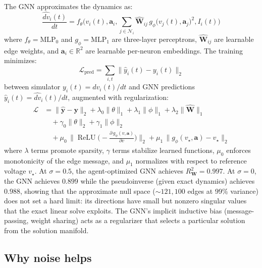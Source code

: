 \documentclass[11pt,a4paper]{article}
\begin{document}
The GNN approximates the dynamics as:
\begin{equation}
\frac{\widehat{dv}_i(t)}{dt}
=f_\theta\Big(
v_i(t),\mathbf{a}_i,
\sum_{j\in\mathcal{N}_i} \widehat{\mathbf{W}}_{ij}\,g_\phi\!\big(v_j(t),\mathbf{a}_j\big)^2,
I_i(t)\Big)
\end{equation}
where $f_\theta = \text{MLP}_0$ and $g_\phi = \text{MLP}_1$ are three-layer perceptrons, $\widehat{\mathbf{W}}_{ij}$ are learnable edge weights, and $\mathbf{a}_i \in \mathbb{R}^2$ are learnable per-neuron embeddings. The training minimizes:
\begin{equation}
\mathcal{L}_{\mathrm{pred}}
= \sum_{i,t}
\big\|
\widehat{y}_i(t) - y_i(t)
\big\|_2
\end{equation}
between simulator $y_i(t) = dv_i(t)/dt$ and GNN predictions $\widehat{y}_i(t) = \widehat{dv}_i(t)/dt$, augmented with regularization:
\begin{equation}
\begin{aligned}
\mathcal{L} &=
\|\widehat{\mathbf y}-\mathbf y\|_2
+ \lambda_0\|\theta\|_{1}
+ \lambda_1\|\phi\|_{1}
+ \lambda_2\|\widehat{\mathbf W}\|_{1} \\
&\quad
+ \gamma_0\|\theta\|_{2}
+ \gamma_1\|\phi\|_{2} \\
&\quad
+ \mu_0\,
\big\|\operatorname{ReLU}\!\big(-\tfrac{\partial\, g_\phi(v,\mathbf{a})}{\partial v}\big)\big\|_2
+ \mu_1\,
\|g_\phi(v_\star,\mathbf{a})-v_\star\|_2
\end{aligned}
\end{equation}
where $\lambda$ terms promote sparsity, $\gamma$ terms stabilize learned functions, $\mu_0$ enforces monotonicity of the edge message, and $\mu_1$ normalizes with respect to reference voltage $v_\star$. At $\sigma = 0.5$, the agent-optimized GNN achieves $R^2_{\mathbf{W}} = 0.997$. At $\sigma = 0$, the GNN achieves $0.899$ while the pseudoinverse (given exact dynamics) achieves $0.988$, showing that the approximate null space (${\sim}121{,}100$ edges at 99\% variance) does not set a hard limit: its directions have small but nonzero singular values that the exact linear solve exploits. The GNN's implicit inductive bias (message-passing, weight sharing) acts as a regularizer that selects a particular solution from the solution manifold.

\subsection{Why noise helps}\label{subsec:why-noise}
\end{document}
